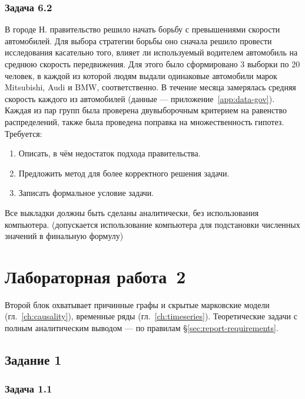 \subsubsection{Задача 6.2}

В городе Н. правительство решило начать борьбу с превышениями скорости автомобилей. Для выбора стратегии борьбы оно сначала решило провести исследования касательно того, влияет ли используемый водителем автомобиль на среднюю скорость передвижения.
Для этого было сформировано 3 выборки по 20 человек, в каждой из которой людям выдали одинаковые автомобили марок Mitsubishi, Audi и BMW, соответственно. В течение месяца замерялась средняя скорость каждого из автомобилей (данные --- приложение~\ref{app:data-gov}). 
Каждая из пар групп была проверена двувыборочным критерием на равенство распределений, также была проведена поправка на множественность гипотез.
Требуется:
\begin{enumerate}
    \item Описать, в чём недостаток подхода правительства.
    \item Предложить метод для более корректного решения задачи.
    \item Записать формальное условие задачи.
\end{enumerate}
Все выкладки должны быть сделаны аналитически, без использования компьютера. (допускается использование компьютера для подстановки численных значений в финальную формулу)
\section{Лабораторная работа~2}
\label{sec:lab2-tasks}

Второй блок охватывает причинные графы и скрытые марковские модели (гл.~\ref{ch:causality}), временные ряды (гл.~\ref{ch:timeseries}).
Теоретические задачи с полным аналитическим выводом --- по правилам \S\ref{sec:report-requirements}.

\subsection{Задание 1}


\subsubsection{Задача 1.1}

